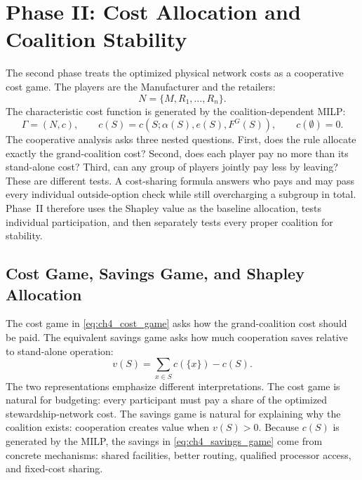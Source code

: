 \section{Phase II: Cost Allocation and Coalition Stability}
\label{sec:game_theory}

The second phase treats the optimized physical network costs as a cooperative cost game. The players are the Manufacturer and the retailers:
\begin{equation*}
N=\{M,R_1,\ldots,R_n\}.
\end{equation*}
The characteristic cost function is generated by the coalition-dependent MILP:
\begin{equation}
\label{eq:ch4_cost_game}
\Gamma=(N,c),
\qquad
c(S)=c\!\left(S;\alpha(S),e(S),F^G(S)\right),
\qquad
c(\emptyset)=0.
\end{equation}
The cooperative analysis asks three nested questions. First, does the rule allocate exactly the grand-coalition cost? Second, does each player pay no more than its stand-alone cost? Third, can any group of players jointly pay less by leaving? These are different tests. A cost-sharing formula answers who pays and may pass every individual outside-option check while still overcharging a subgroup in total. Phase~II therefore uses the Shapley value as the baseline allocation, tests individual participation, and then separately tests every proper coalition for stability.

\subsection{Cost Game, Savings Game, and Shapley Allocation}

The cost game in \eqref{eq:ch4_cost_game} asks how the grand-coalition cost should be paid. The equivalent savings game asks how much cooperation saves relative to stand-alone operation:
\begin{equation}
\label{eq:ch4_savings_game}
v(S)=\sum_{x\in S}c(\{x\})-c(S).
\end{equation}
The two representations emphasize different interpretations. The cost game is natural for budgeting: every participant must pay a share of the optimized stewardship-network cost. The savings game is natural for explaining why the coalition exists: cooperation creates value when $v(S)>0$. Because $c(S)$ is generated by the MILP, the savings in \eqref{eq:ch4_savings_game} come from concrete mechanisms: shared facilities, better routing, qualified processor access, and fixed-cost sharing.

